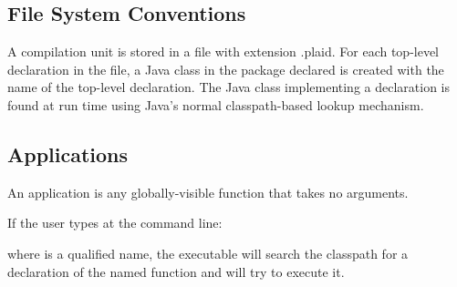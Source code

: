 
\subsection{File System Conventions}

A compilation unit is stored in a file with extension .plaid.  For each
top-level declaration in the file, a Java class in the package declared
is created with the name of the top-level declaration.  The Java class
implementing a declaration is found at run time using Java's normal
classpath-based lookup mechanism.




\subsection{Applications}

An application is any globally-visible function that takes no arguments.

\noindent
If the user types at the command line:

\begin{quote}
\end{quote}

\noindent
where  is a qualified name, the 
executable will search the classpath for a declaration of the named
function and will try to execute it.


